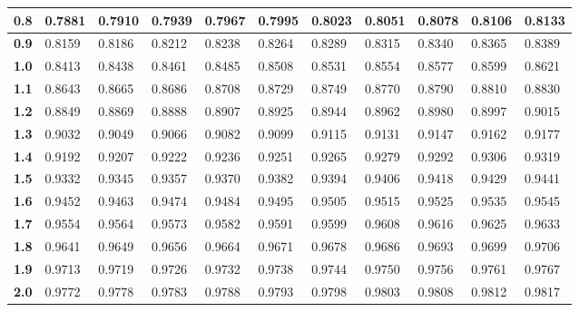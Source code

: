 \begin{longtable}{|l|l|l|l|l|l|l|l|l|l|l|}
    \textbf{0.8}  & 0.7881  & 0.7910  & 0.7939  & 0.7967  & 0.7995  & 0.8023  & 0.8051  & 0.8078  & 0.8106  & 0.8133\\ \hline
    
    \textbf{0.9}  & 0.8159  & 0.8186  & 0.8212  & 0.8238  & 0.8264  & 0.8289  & 0.8315  & 0.8340  & 0.8365  & 0.8389\\ \hline
    
    \textbf{1.0}  & 0.8413  & 0.8438  & 0.8461  & 0.8485  & 0.8508  & 0.8531  & 0.8554  & 0.8577  & 0.8599  & 0.8621\\ \hline
    
    \textbf{1.1}  & 0.8643  & 0.8665  & 0.8686  & 0.8708  & 0.8729  & 0.8749  & 0.8770  & 0.8790  & 0.8810  & 0.8830\\ \hline
    
    \textbf{1.2}  & 0.8849  & 0.8869  & 0.8888  & 0.8907  & 0.8925  & 0.8944  & 0.8962  & 0.8980  & 0.8997  & 0.9015\\ \hline
    
    \textbf{1.3}  & 0.9032  & 0.9049  & 0.9066  & 0.9082  & 0.9099  & 0.9115  & 0.9131  & 0.9147  & 0.9162  & 0.9177\\ \hline
    
    \textbf{1.4}  & 0.9192  & 0.9207  & 0.9222  & 0.9236  & 0.9251  & 0.9265  & 0.9279  & 0.9292  & 0.9306  & 0.9319\\ \hline
    
    \textbf{1.5}  & 0.9332  & 0.9345  & 0.9357  & 0.9370  & 0.9382  & 0.9394  & 0.9406  & 0.9418  & 0.9429  & 0.9441\\ \hline
    
    \textbf{1.6}  & 0.9452  & 0.9463  & 0.9474  & 0.9484  & 0.9495  & 0.9505  & 0.9515  & 0.9525  & 0.9535  & 0.9545\\ \hline
    
    \textbf{1.7}  & 0.9554  & 0.9564  & 0.9573  & 0.9582  & 0.9591  & 0.9599  & 0.9608  & 0.9616  & 0.9625  & 0.9633\\ \hline
    
    \textbf{1.8}  & 0.9641  & 0.9649  & 0.9656  & 0.9664  & 0.9671  & 0.9678  & 0.9686  & 0.9693  & 0.9699  & 0.9706\\ \hline
    
    \textbf{1.9}  & 0.9713  & 0.9719  & 0.9726  & 0.9732  & 0.9738  & 0.9744  & 0.9750  & 0.9756  & 0.9761  & 0.9767\\ \hline
    
    \textbf{2.0}  & 0.9772  & 0.9778  & 0.9783  & 0.9788  & 0.9793  & 0.9798  & 0.9803  & 0.9808  & 0.9812  & 0.9817\\ \hline
    

\end{longtable}
